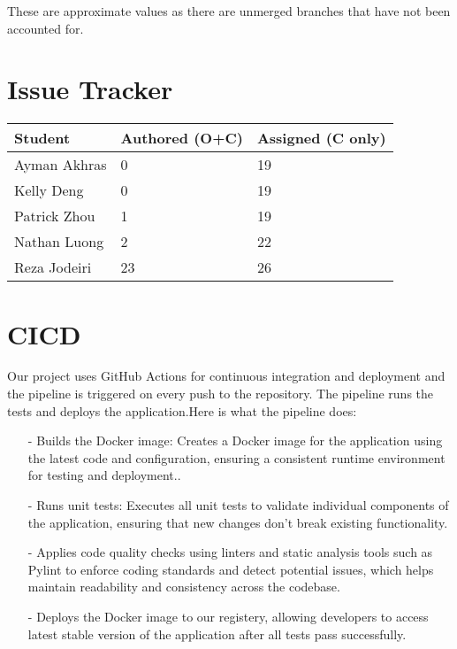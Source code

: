 \documentclass{article}
\begin{document}
\noindent These are approximate values as there are unmerged branches that have not been accounted for.

\section{Issue Tracker}

\begin{table}[H]
\centering
\begin{tabular}{lll}
\toprule
\textbf{Student} & \textbf{Authored (O+C)} & \textbf{Assigned (C only)}\\
\midrule
Ayman Akhras & 0 & 19 \\
Kelly Deng & 0 & 19\\
Patrick Zhou & 1 & 19 \\
Nathan Luong & 2 & 22 \\
Reza Jodeiri & 23 & 26 \\
\bottomrule
\end{tabular}
\end{table}


\section{CICD}

Our project uses GitHub Actions for continuous integration and deployment and the pipeline is triggered on every push to the repository. The pipeline runs the tests and deploys the application.Here is  what the pipeline does:
\begin{itemize}
    \item[-] Builds the Docker image: Creates a Docker image for the application using the latest code and configuration, ensuring a consistent runtime environment for testing and deployment..
    \item[-] Runs unit tests: Executes all unit tests to validate individual components of the application, ensuring that new changes don’t break existing functionality.
    \item[-] Applies code quality checks using linters and static analysis tools such as Pylint to enforce coding standards and detect potential issues, which helps maintain readability and consistency across the codebase.
    \item[-] Deploys the Docker image to our registery, allowing developers to access latest stable version of the application after all tests pass successfully.
\end{itemize}
\end{document}
